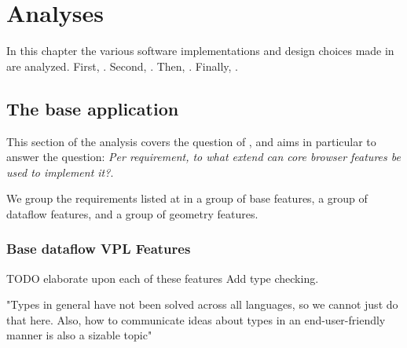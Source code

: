 \chapter{Analyses}%
\label{chap:analyses}

In this chapter the various software implementations and design choices made in  are analyzed. 
First, .
Second, .
Then, .
Finally, .

\section{The base application}
\label{sec:analyses:representation}

This section of the analysis covers the question of \mySubRQOneTitle, and aims in particular to answer the question: \emph{Per requirement, to what extend can core browser features be used to implement it?}.

We group the requirements listed at  in a group of base features,
a group of dataflow features, and a group of geometry features.

\subsection{Base dataflow VPL Features}

\begin{note}


TODO elaborate upon each of these features
Add type checking.

"Types in general have not been solved across all languages, so we cannot just do that here. Also, how to communicate ideas about types in an end-user-friendly manner is also a sizable topic" 
\end{note}

